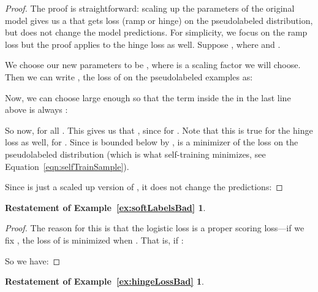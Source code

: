 \documentclass[11pt]{article}
\begin{document}
\begin{proof}
The proof is straightforward: scaling up the parameters of the original model  gives us a  that gets  loss (ramp or hinge) on the pseudolabeled distribution, but does not change the model predictions.
For simplicity, we focus on the ramp loss but the proof applies to the hinge loss as well.
Suppose , where  and .

We choose our new parameters to be , where  is a scaling factor we will choose.
Then we can write , the loss of  on the pseudolabeled examples  as:

Now, we can choose large enough  so that the term inside the  in the last line above is always :

So now,  for all .
This gives us that , since  for .
Note that this is true for the hinge loss as well,  for .
Since  is bounded below by ,  is a minimizer of the loss on the pseudolabeled distribution (which is what self-training minimizes, see Equation~\eqref{eqn:selfTrainSample}).

Since  is just a scaled up version of , it does not change the predictions:


\end{proof}



\newtheorem*{softLabelsBadExample}{Restatement of Example~\ref{ex:softLabelsBad}}

\begin{softLabelsBadExample}
\softLabelsBadText{}
\end{softLabelsBadExample}

\begin{proof}
The reason for this is that the logistic loss is a proper scoring loss---if we fix , the loss of  is minimized when . That is, if :

So we have:

\end{proof}


\newtheorem*{hingeLossBadExample}{Restatement of Example~\ref{ex:hingeLossBad}}

\begin{hingeLossBadExample}
\HingeLossBadText{}
\end{hingeLossBadExample}
\end{document}
